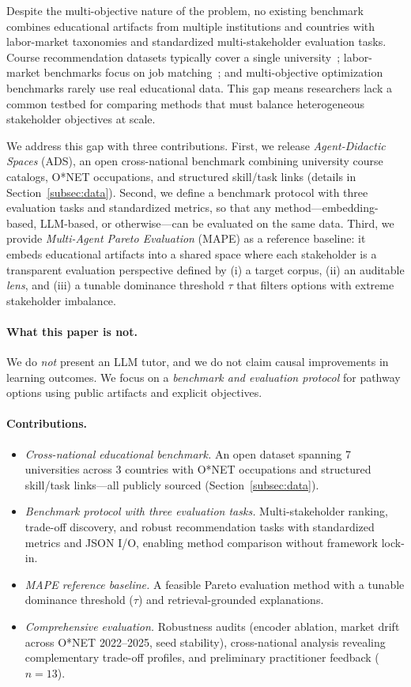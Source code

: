\documentclass[sigconf,review]{acmart}
\newcommand{\NumUniversities}{7}
\newcommand{\NumCountries}{3}                %
\newcommand{\ADS}{\textsc{ADS}\xspace}
\newcommand{\MAPE}{\textsc{MAPE}\xspace}
\begin{document}
Despite the multi-objective nature of the problem, no existing benchmark combines educational artifacts from multiple institutions and countries with labor-market taxonomies and standardized multi-stakeholder evaluation tasks. Course recommendation datasets typically cover a single university~\cite{morsy2019course2vec}; labor-market benchmarks focus on job matching~\cite{giabelli2021skills2job}; and multi-objective optimization benchmarks rarely use real educational data. This gap means researchers lack a common testbed for comparing methods that must balance heterogeneous stakeholder objectives at scale.

We address this gap with three contributions. First, we release \emph{Agent-Didactic Spaces} (\ADS), an open cross-national benchmark combining university course catalogs, O*NET occupations, and structured skill/task links (details in Section~\ref{subsec:data}). Second, we define a benchmark protocol with three evaluation tasks and standardized metrics, so that any method---embedding-based, LLM-based, or otherwise---can be evaluated on the same data. Third, we provide \emph{Multi-Agent Pareto Evaluation} (\MAPE) as a reference baseline: it embeds educational artifacts into a shared space where each stakeholder is a transparent evaluation perspective defined by (i) a target corpus, (ii) an auditable \emph{lens}, and (iii) a tunable dominance threshold $\tau$ that filters options with extreme stakeholder imbalance.

\paragraph{What this paper is not.}
We do \emph{not} present an LLM tutor, and we do not claim causal improvements in learning outcomes. We focus on a \emph{benchmark and evaluation protocol} for pathway options using public artifacts and explicit objectives.

\paragraph{Contributions.}
\begin{itemize}
  \item \textit{Cross-national educational benchmark.} An open dataset spanning {\NumUniversities} universities across {\NumCountries} countries with O*NET occupations and structured skill/task links---all publicly sourced (Section~\ref{subsec:data}).
  \item \textit{Benchmark protocol with three evaluation tasks.} Multi-stakeholder ranking, trade-off discovery, and robust recommendation tasks with standardized metrics and JSON I/O, enabling method comparison without framework lock-in.
  \item \textit{\MAPE reference baseline.} A feasible Pareto evaluation method with a tunable dominance threshold ($\tau$) and retrieval-grounded explanations.
  \item \textit{Comprehensive evaluation.} Robustness audits (encoder ablation, market drift across O*NET 2022--2025, seed stability), cross-national analysis revealing complementary trade-off profiles, and preliminary practitioner feedback ($n{=}13$).
\end{itemize}
\end{document}
